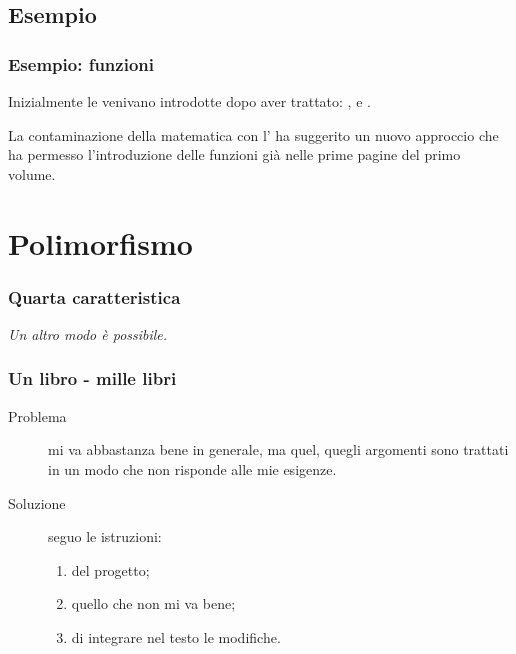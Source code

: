 \documentclass{beamer} %
\begin{document}
\subsection{Esempio} 

\begin{frame}\frametitle{Esempio: funzioni}

Inizialmente le  venivano introdotte dopo aver 
trattato: ,  e .

\pause
La contaminazione della matematica con l' ha suggerito 
un nuovo approccio che ha permesso l'introduzione delle funzioni 
già nelle prime pagine del primo volume.

\pause
\medskip
{}

\end{frame}


\section{Polimorfismo}


\begin{frame}\frametitle{Quarta caratteristica}

\begin{center}  \end{center}

\vspace{20mm}
\begin{flushright}
\emph{Un altro modo è possibile.}
\end{flushright}

\end{frame}


\begin{frame}\frametitle{Un libro - mille libri}

\begin{description}
\item [Problema ] mi va abbastanza bene in generale, ma quel, quegli 
argomenti sono trattati in un modo che non risponde alle mie esigenze.
\item [Soluzione ] seguo le istruzioni:
\begin{enumerate} [<+->]
\item {} del progetto;
\item {} quello che non mi va bene;
\item {} di integrare nel testo le modifiche.
\end{enumerate}
\end{description}

\end{frame}
\end{document}
